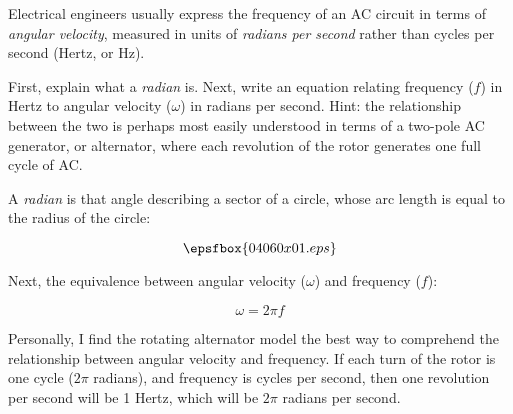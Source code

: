 

Electrical engineers usually express the frequency of an AC circuit in terms of {\it angular velocity}, measured in units of {\it radians per second} rather than cycles per second (Hertz, or Hz).

First, explain what a {\it radian} is.  Next, write an equation relating frequency ($f$) in Hertz to angular velocity ($\omega$) in radians per second.  Hint: the relationship between the two is perhaps most easily understood in terms of a two-pole AC generator, or alternator, where each revolution of the rotor generates one full cycle of AC.







A {\it radian} is that angle describing a sector of a circle, whose arc length is equal to the radius of the circle:

$$\epsfbox{04060x01.eps}$$

\vskip 10pt

Next, the equivalence between angular velocity ($\omega$) and frequency ($f$):

$$\omega = 2 \pi f$$







Personally, I find the rotating alternator model the best way to comprehend the relationship between angular velocity and frequency.  If each turn of the rotor is one cycle ($2 \pi$ radians), and frequency is cycles per second, then one revolution per second will be 1 Hertz, which will be $2 \pi$ radians per second.




